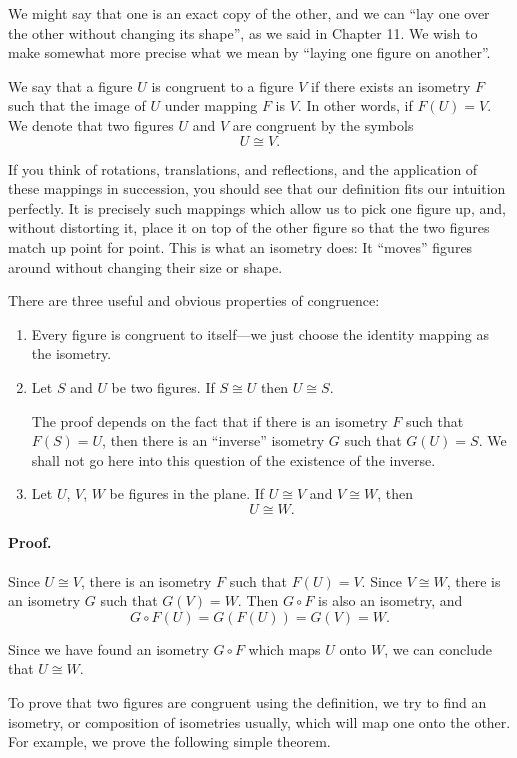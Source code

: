 \documentclass[12pt]{book} %
\begin{document}
\begin{ExerciseList}
\begin{ExerciseList}

We might say that one is an exact copy of the other, and we can ``lay one over the other without changing its shape'', as we said in Chapter 11. We wish to make somewhat more precise what we mean by ``laying one figure on another''.

We say that a figure $U$ is congruent to a figure $V$ if there exists an isometry $F$ such that the image of $U$ under mapping $F$ is $V$. In other words, if $F(U)=V$. We denote that two figures $U$ and $V$ are congruent by the symbols
\[
U\cong V.
\]

If you think of rotations, translations, and reflections, and the application of these mappings in succession, you should see that our definition fits our intuition perfectly. It is precisely such mappings which allow us to pick one figure up, and, without distorting it, place it on top of the other figure so that the two figures match up point for point. This is what an isometry does: It ``moves'' figures around without changing their size or shape.

There are three useful and obvious properties of congruence:
\begin{enumerate}
\item Every figure is congruent to itself---we just choose the identity mapping as the isometry.
\item Let $S$ and $U$ be two figures. If $S\cong U$ then $U\cong S$.

The proof depends on the fact that if there is an isometry $F$ such that $F(S)=U$, then there is an ``inverse'' isometry $G$ such that $G(U)=S$. We shall not go here into this question of the existence of the inverse.
\item Let $U$, $V$, $W$ be figures in the plane. If $U\cong V$ and $V\cong W$, then
\[
U\cong W.
\]
\end{enumerate}

\paragraph{Proof.}
Since $U\cong V$, there is an isometry $F$ such that $F(U)=V$. Since $V\cong W$, there is an isometry $G$ such that $G(V)=W$. Then $G\circ F$ is also an isometry, and
\[
G\circ F(U)=G(F(U))=G(V)=W.
\]

Since we have found an isometry $G\circ F$ which maps $U$ onto $W$, we can conclude that $U\cong W$.

To prove that two figures are congruent using the definition, we try to find an isometry, or composition of isometries usually, which will map one onto the other. For example, we prove the following simple theorem.


\end{ExerciseList}
\end{ExerciseList}
\end{document}
